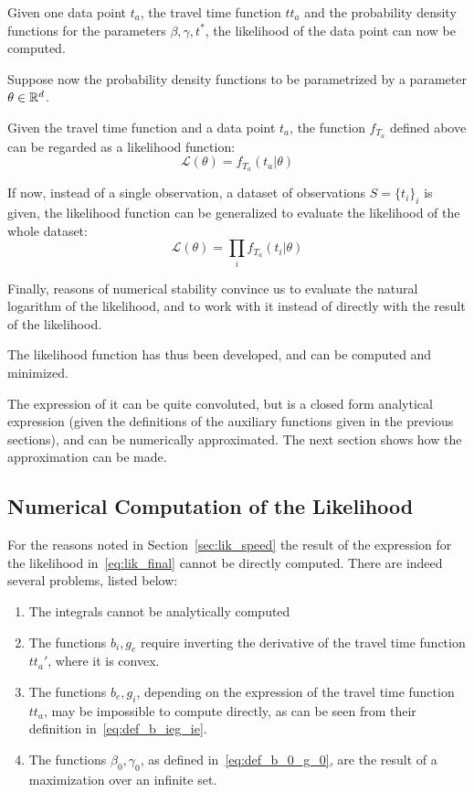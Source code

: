 Given one data point \(t_a\), the travel time function \(tt_a\) and the probability density functions for the parameters \(\beta, \gamma, t^*\),
the likelihood of the data point can now be computed.

Suppose now the probability density functions to be parametrized by a parameter \(\theta\in\mathbb{R}^d\).

Given the travel time function and a data point \(t_a\),
the function \(f_{T_a}\) defined above can be regarded as a likelihood function:
\begin{equation*}
  \mathcal{L}(\theta) = f_{T_a}(t_a | \theta)
\end{equation*}

If now, instead of a single observation, a dataset of observations \(S = \{t_i\}_i\) is given,
the likelihood function can be generalized to evaluate the likelihood of the whole dataset:
\begin{equation*}
  \mathcal{L}(\theta) = \prod_i f_{T_a}(t_i | \theta)
\end{equation*}

Finally, reasons of numerical stability convince us to evaluate the natural logarithm of the likelihood,
and to work with it instead of directly with the result of the likelihood.

The likelihood function has thus been developed, and can be computed and minimized.

The expression of it can be quite convoluted, but is a closed form analytical expression
(given the definitions of the auxiliary functions given in the previous sections),
and can be numerically approximated.
The next section shows how the approximation can be made.

\subsection{Numerical Computation of the Likelihood}
\label{sec:numerical_lik}

For the reasons noted in Section~\ref{sec:lik_speed}
the result of the expression for the likelihood in~\eqref{eq:lik_final} cannot be directly computed.
There are indeed several problems, listed below:
\begin{enumerate}
\item The integrals cannot be analytically computed
\item The functions \(b_i, g_e\) require inverting the derivative of the travel time function \(tt_a'\),
  where it is convex.
\item The functions \(b_e, g_i\), depending on the expression of the travel time function \(tt_a\),
  may be impossible to compute directly, as can be seen from their definition in~\eqref{eq:def_b_ieg_ie}.
\item The functions \(\beta_0, \gamma_0\), as defined in~\eqref{eq:def_b_0_g_0},
  are the result of a maximization over an infinite set.
\end{enumerate}

